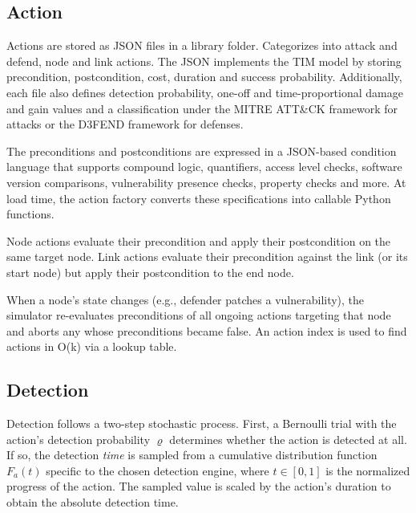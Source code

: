 \documentclass{llncs}
\begin{document}
\subsection{Action}
Actions are stored as JSON files in a library folder. Categorizes into attack and defend, node and link actions.
The JSON implements the TIM model by storing precondition, postcondition, cost, duration and success probability.
Additionally, each file also defines detection probability, one-off and time-proportional damage and gain values and a classification under the MITRE ATT\&CK framework for attacks or the D3FEND framework for defenses.

The preconditions and postconditions are expressed in a JSON-based condition language that supports compound logic, quantifiers, access level checks, software version comparisons, vulnerability presence checks, property checks and more. At load time, the action factory converts these specifications into callable Python functions.

Node actions evaluate their precondition and apply their postcondition on the same target node. Link actions evaluate their precondition against the link (or its start node) but apply their postcondition to the end node.

When a node's state changes (e.g., defender patches a vulnerability), the simulator re-evaluates preconditions of all ongoing actions targeting that node and aborts any whose preconditions became false. An action index is used to find actions in O(k) via a lookup table.

\subsection{Detection}
Detection follows a two-step stochastic process. First, a Bernoulli trial with the action's detection probability $\varrho$ determines whether the action is detected at all. If so, the detection \emph{time} is sampled from a cumulative distribution function $F_a(t)$ specific to the chosen detection engine, where $t \in [0,1]$ is the normalized progress of the action. The sampled value is scaled by the action's duration to obtain the absolute detection time.
\end{document}

